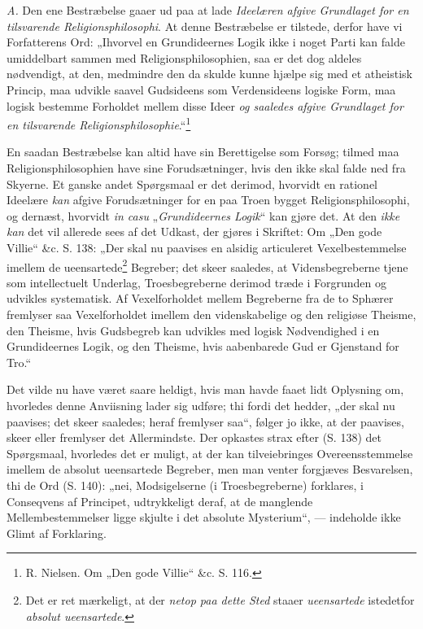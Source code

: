 \documentclass[12pt,a4paper]{book}
\newcommand{\opage}[1]{\marginnote{\footnotesize\textit{[#1]}}}
\begin{document}
\textit{A.} Den ene Bestræbelse gaaer ud paa at lade \emph{Ideelæren afgive Grundlaget for en tilsvarende
Religionsphilosophi}. At denne Bestræbelse er tilstede,
derfor have vi Forfatterens Ord: „Ihvorvel en
Grundideernes Logik ikke i noget Parti kan falde umiddelbart
sammen med Religionsphilosophien, saa er det
dog aldeles nødvendigt, at den, medmindre den da skulde
kunne hjælpe sig med et atheistisk Princip, maa udvikle
saavel Gudsideens som Verdensideens logiske Form, maa
logisk bestemme Forholdet mellem disse Ideer \emph{og saaledes afgive Grundlaget for en tilsvarende
Religionsphilosophie}.“\footnote{R. Nielsen. Om „Den gode Villie“ \&c. S. 116.}

En saadan Bestræbelse kan altid have sin Berettigelse
som Forsøg; tilmed maa Religionsphilosophien
\opage{71}\setcounter{footnote}{0}have sine Forudsætninger, hvis den ikke skal falde ned
fra Skyerne. Et ganske andet Spørgsmaal er det derimod,
hvorvidt en rationel Ideelære \emph{kan} afgive Forudsætninger
for en paa Troen bygget Religionsphilosophi,
og dernæst, hvorvidt \textit{in casu} „\emph{Grundideernes Logik}“
kan gjøre det. At den \emph{ikke kan} det vil allerede sees af
det Udkast, der gjøres i Skriftet: Om „Den gode Villie“
\&c. S. 138: „Der skal nu paavises en alsidig articuleret
Vexelbestemmelse imellem de ueensartede\footnote{Det er ret mærkeligt, at der \emph{netop paa dette Sted} staaer
\emph{ueensartede} istedetfor \emph{absolut ueensartede}.} Begreber;
det skeer saaledes, at Vidensbegreberne tjene som intellectuelt
Underlag, Troesbegreberne derimod træde i Forgrunden
og udvikles systematisk. Af Vexelforholdet mellem
Begreberne fra de to Sphærer fremlyser saa Vexelforholdet
imellem den videnskabelige og den religiøse
Theisme, den Theisme, hvis Gudsbegreb kan udvikles
med logisk Nødvendighed i en Grundideernes Logik, og
den Theisme, hvis aabenbarede Gud er Gjenstand
for Tro.“

Det vilde nu have været saare heldigt, hvis man
havde faaet lidt Oplysning om, hvorledes denne Anviisning
lader sig udføre; thi fordi det hedder, „der
skal nu paavises; det skeer saaledes; heraf fremlyser
saa“, følger jo ikke, at der paavises, skeer eller fremlyser
det Allermindste. Der opkastes strax efter (S. 138)
det Spørgsmaal, hvorledes det er muligt, at der
kan tilveiebringes Overeensstemmelse imellem de absolut
\opage{72}\setcounter{footnote}{0}ueensartede Begreber, men man venter forgjæves Besvarelsen,
thi de Ord (S. 140): „nei, Modsigelserne
(i Troesbegreberne) forklares, i Conseqvens af Principet,
udtrykkeligt deraf, at de manglende Mellembestemmelser
ligge skjulte i det absolute Mysterium“, ---
indeholde ikke Glimt af Forklaring.
\end{document}
